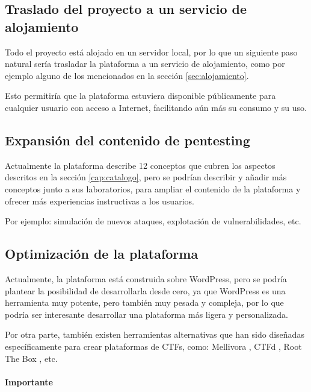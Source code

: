         \subsection{Traslado del proyecto a un servicio de alojamiento}

            Todo el proyecto está alojado en un servidor local, por lo que un siguiente paso natural sería trasladar la plataforma a un servicio de alojamiento, como por ejemplo alguno de los mencionados en la sección \ref{sec:alojamiento}.

            Esto permitiría que la plataforma estuviera disponible públicamente para cualquier usuario con acceso a Internet, facilitando aún más su consumo y su uso.

        \subsection{Expansión del contenido de pentesting}

            Actualmente la plataforma describe 12 conceptos que cubren los aspectos descritos en la sección \ref{cap:catalogo}, pero se podrían describir y añadir más conceptos junto a sus laboratorios, para ampliar el contenido de la plataforma y ofrecer más experiencias instructivas a los usuarios.

            Por ejemplo: simulación de nuevos ataques, explotación de vulnerabilidades, etc.
        
        \subsection{Optimización de la plataforma}

            Actualmente, la plataforma está construida sobre WordPress, pero se podría plantear la posibilidad de desarrollarla desde cero, ya que WordPress es una herramienta muy potente, pero también muy pesada y compleja, por lo que podría ser interesante desarrollar una plataforma más ligera y personalizada.

            Por otra parte, también existen herramientas alternativas que han sido diseñadas específicamente para crear plataformas de CTFs, como: Mellivora \cite{mellivora}, CTFd \cite{ctfd}, Root The Box \cite{root-the-box}, etc.

            \paragraph{Importante}
            
